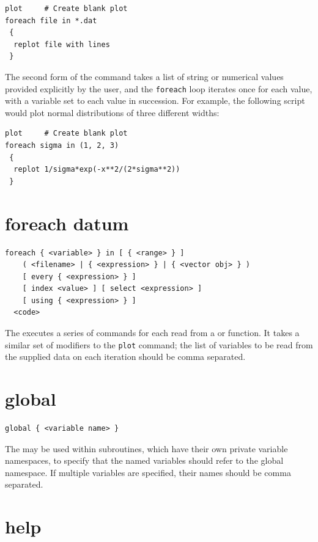 \begin{verbatim}
plot     # Create blank plot
foreach file in *.dat
 {
  replot file with lines
 }
\end{verbatim}

The second form of the command takes a list of string or numerical values
provided explicitly by the user, and the {\tt foreach} loop iterates once for
each value, with a variable set to each value in succession.  For example, the
following script would plot normal distributions of three different widths:

\begin{verbatim}
plot     # Create blank plot
foreach sigma in (1, 2, 3)
 {
  replot 1/sigma*exp(-x**2/(2*sigma**2))
 }
\end{verbatim}


\section{foreach datum}

\begin{verbatim}
foreach { <variable> } in [ { <range> } ]
    ( <filename> | { <expression> } | { <vector obj> } )
    [ every { <expression> } ]
    [ index <value> ] [ select <expression> ]
    [ using { <expression> } ]
  <code>
\end{verbatim}

The  executes a series of commands for each \datapoint
read from a \datafile or function.  It takes a similar set of modifiers to the
{\tt plot} command; the list of variables to be read from the supplied data on
each iteration should be comma separated.


\section{global}

\begin{verbatim}
global { <variable name> }
\end{verbatim}

The  may be used within subroutines, which have their
own private variable namespaces, to specify that the named variables should
refer to the global namespace. If multiple variables are specified, their names
should be comma separated.


\section{help}

